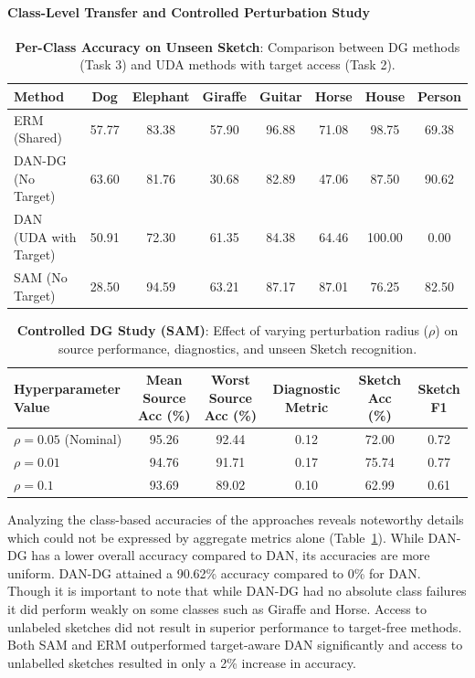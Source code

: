 \documentclass{article}
\begin{document}
\paragraph{Class-Level Transfer and Controlled Perturbation Study}
\begin{table}[H]
    \centering
    \caption{\textbf{Per-Class Accuracy on Unseen Sketch}: Comparison between DG methods (Task 3) and UDA methods with target access (Task 2).}
    \label{tab:task3_per_class}
    \begin{tabular}{lccccccc}
        \toprule
        \textbf{Method} & \textbf{Dog} & \textbf{Elephant} & \textbf{Giraffe} & \textbf{Guitar} & \textbf{Horse} & \textbf{House} & \textbf{Person} \\
        \midrule
        ERM (Shared) & 57.77 & 83.38 & 57.90 & 96.88 & 71.08 & 98.75 & 69.38 \\
        DAN-DG (No Target) & 63.60 & 81.76 & 30.68 & 82.89 & 47.06 & 87.50 & 90.62 \\
        DAN (UDA with Target) & 50.91 & 72.30 & 61.35 & 84.38 & 64.46 & 100.00 & 0.00 \\
        SAM (No Target) & 28.50 & 94.59 & 63.21 & 87.17 & 87.01 & 76.25 & 82.50 \\
        \bottomrule
    \end{tabular}
\end{table}

\begin{table}[H]
    \centering
    \caption{\textbf{Controlled DG Study (SAM)}: Effect of varying perturbation radius ($\rho$) on source performance, diagnostics, and unseen Sketch recognition.}
    \label{tab:task3_design_study}
    \begin{tabular}{lccccc}
        \toprule
        \textbf{Hyperparameter Value} & \textbf{Mean Source Acc (\%)} & \textbf{Worst Source Acc (\%)} & \textbf{Diagnostic Metric} & \textbf{Sketch Acc (\%)} & \textbf{Sketch F1} \\
        \midrule
        $\rho = 0.05$ (Nominal) & 95.26 & 92.44 & 0.12 & 72.00 & 0.72 \\
        $\rho = 0.01$ & 94.76 & 91.71 & 0.17 & 75.74 & 0.77 \\
        $\rho = 0.1$ & 93.69 & 89.02 & 0.10 & 62.99 & 0.61 \\
        \bottomrule
    \end{tabular}
\end{table}
Analyzing the class-based accuracies of the approaches reveals noteworthy details which could not be expressed by aggregate metrics alone (Table~\ref{tab:task3_per_class}). While DAN-DG has a lower overall accuracy compared to DAN, its accuracies are more uniform. DAN-DG attained a 90.62\% accuracy compared to 0\% for DAN. Though it is important to note that while DAN-DG had no absolute class failures it did perform weakly on some classes such as Giraffe and Horse. Access to unlabeled sketches did not result in superior performance to target-free methods. Both SAM and ERM outperformed target-aware DAN significantly and access to unlabelled sketches resulted in only a 2\% increase in accuracy.
\end{document}

